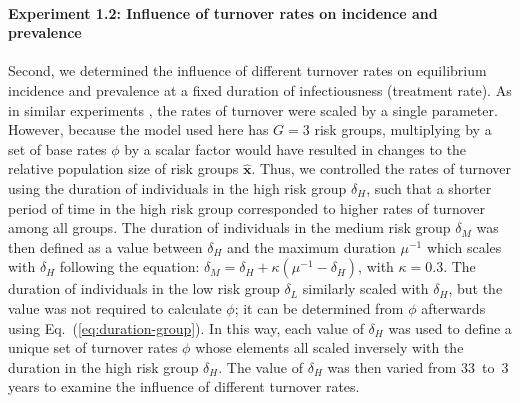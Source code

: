 \paragraph{Experiment 1.2: Influence of turnover rates on incidence and prevalence}
\label{p:exp-turnover-1D}
Second, we determined the influence of different turnover rates on
equilibrium incidence and prevalence
at a fixed duration of infectiousness (treatment rate).
As in similar experiments \citep{Zhang2012,Henry2015},
the rates of turnover were scaled by a single parameter.
However, because the model used here has $G = 3$ risk groups,
multiplying by a set of base rates $\phi$ by a scalar factor
would have resulted in changes to the relative population size of risk groups $\bm{\hat{x}}$.
Thus, we controlled the rates of turnover using
the duration of individuals in the high risk group $\delta_H$,
such that a shorter period of time in the high risk group
corresponded to higher rates of turnover among all groups.
The duration of individuals in the medium risk group $\delta_M$
was then defined as a value between $\delta_H$ and the maximum duration $\mu^{-1}$
which scales with $\delta_H$ following the equation:
$\delta_M = \delta_H + \kappa \left(\mu^{-1} - \delta_H\right)$, with $\kappa = 0.3$.
The duration of individuals in the low risk group $\delta_L$
similarly scaled with $\delta_H$,
but the value was not required to calculate $\phi$;
it can be determined from $\phi$ afterwards
using Eq.~(\ref{eq:duration-group}).
In this way, each value of $\delta_H$ was used to define a unique set of turnover rates $\phi$
whose elements all scaled inversely with the duration in the high risk group $\delta_H$.
The value of $\delta_H$ was then varied from 33~to~3 years
to examine the influence of different turnover rates.
